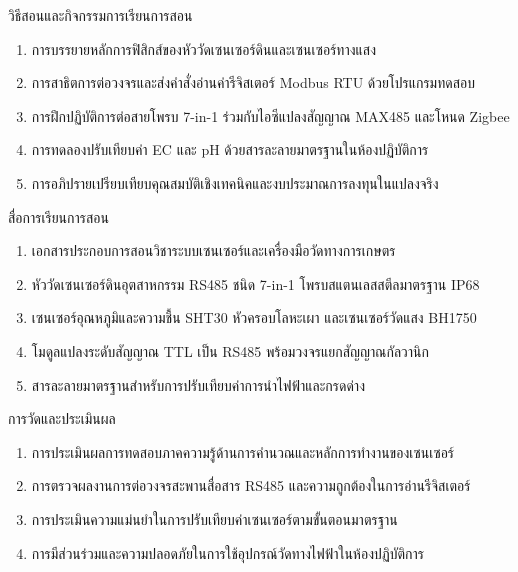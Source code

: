 \newpage

\begin{planbox}{วิธีสอนและกิจกรรมการเรียนการสอน}
\begin{enumerate}[topsep=1pt, itemsep=0.5pt, partopsep=0pt, parsep=0pt, leftmargin=1.5em]
    \item การบรรยายหลักการฟิสิกส์ของหัววัดเซนเซอร์ดินและเซนเซอร์ทางแสง
    \item การสาธิตการต่อวงจรและส่งคำสั่งอ่านค่ารีจิสเตอร์ Modbus RTU ด้วยโปรแกรมทดสอบ
    \item การฝึกปฏิบัติการต่อสายโพรบ 7-in-1 ร่วมกับไอซีแปลงสัญญาณ MAX485 และโหนด Zigbee
    \item การทดลองปรับเทียบค่า EC และ pH ด้วยสารละลายมาตรฐานในห้องปฏิบัติการ
    \item การอภิปรายเปรียบเทียบคุณสมบัติเชิงเทคนิคและงบประมาณการลงทุนในแปลงจริง
\end{enumerate}
\end{planbox}

\begin{planbox}{สื่อการเรียนการสอน}
\begin{enumerate}[topsep=1pt, itemsep=0.5pt, partopsep=0pt, parsep=0pt, leftmargin=1.5em]
    \item เอกสารประกอบการสอนวิชาระบบเซนเซอร์และเครื่องมือวัดทางการเกษตร
    \item หัววัดเซนเซอร์ดินอุตสาหกรรม RS485 ชนิด 7-in-1 โพรบสแตนเลสสตีลมาตรฐาน IP68
    \item เซนเซอร์อุณหภูมิและความชื้น SHT30 หัวครอบโลหะเผา และเซนเซอร์วัดแสง BH1750
    \item โมดูลแปลงระดับสัญญาณ TTL เป็น RS485 พร้อมวงจรแยกสัญญาณกัลวานิก
    \item สารละลายมาตรฐานสำหรับการปรับเทียบค่าการนำไฟฟ้าและกรดด่าง
\end{enumerate}
\end{planbox}

\begin{planbox}{การวัดและประเมินผล}
\begin{enumerate}[topsep=1pt, itemsep=0.5pt, partopsep=0pt, parsep=0pt, leftmargin=1.5em]
    \item การประเมินผลการทดสอบภาคความรู้ด้านการคำนวณและหลักการทำงานของเซนเซอร์
    \item การตรวจผลงานการต่อวงจรสะพานสื่อสาร RS485 และความถูกต้องในการอ่านรีจิสเตอร์
    \item การประเมินความแม่นยำในการปรับเทียบค่าเซนเซอร์ตามขั้นตอนมาตรฐาน
    \item การมีส่วนร่วมและความปลอดภัยในการใช้อุปกรณ์วัดทางไฟฟ้าในห้องปฏิบัติการ
\end{enumerate}
\end{planbox}

